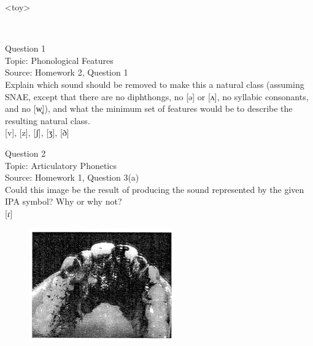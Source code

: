 \documentclass[12pt]{article}
\begin{document}
<toy>


\newpage

\begin{center}
\textbf{{\color{red}{\HUGE END OF EXAM}}}\\

\end{center}
\newpage

\begin{center}
\textbf{{\color{blue}{\HUGE START OF EXAM\\}}}

\textbf{{\color{blue}{\HUGE Student ID: 40922\\}}}

\textbf{{\color{blue}{\HUGE 4:00\\}}}

\end{center}
\newpage

{\large Question 1}\\

Topic: Phonological Features\\
Source: Homework 2, Question 1\\

Explain which sound should be removed to make this a natural class (assuming SNAE, except that there are no diphthongs, no [ə] or [ʌ], no syllabic consonants, and no [w̥]), and what the minimum set of features would be to describe the resulting natural class.\\

{[v]}, {[z]}, {[ʃ]}, {[ʒ]}, {[ð]}


\newpage

{\large Question 2}\\

Topic: Articulatory Phonetics\\
Source: Homework 1, Question 3(a)\\

Could this image be the result of producing the sound represented by the given IPA symbol? Why or why not?\\

{[ɾ]}

\begin{figure}[H]
\includegraphics{../images/staticpalatography_stop.png}
\end{figure}
\end{document}
